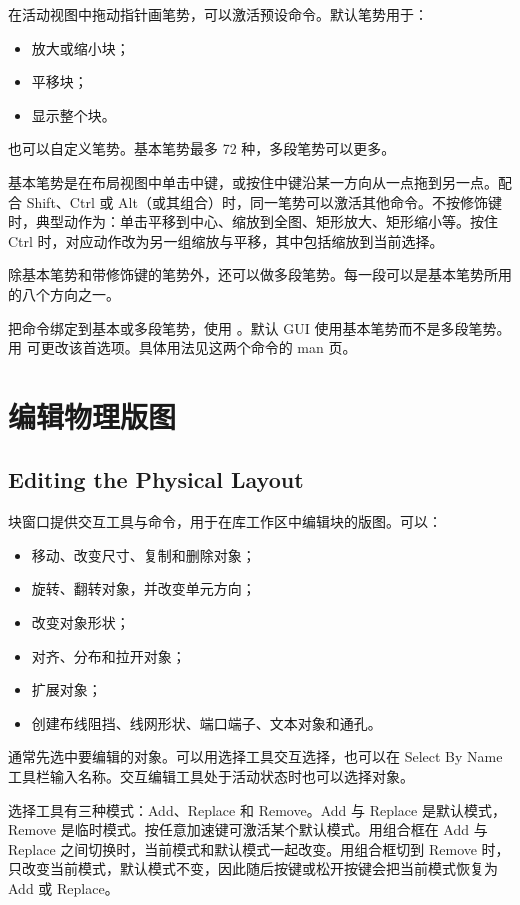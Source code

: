 在活动视图中拖动指针画笔势，可以激活预设命令。默认笔势用于：
\begin{itemize}
  \item 放大或缩小块；
  \item 平移块；
  \item 显示整个块。
\end{itemize}

也可以自定义笔势。基本笔势最多 72 种，多段笔势可以更多。

基本笔势是在布局视图中单击中键，或按住中键沿某一方向从一点拖到另一点。配合 Shift、Ctrl 或 Alt（或其组合）时，同一笔势可以激活其他命令。不按修饰键时，典型动作为：单击平移到中心、缩放到全图、矩形放大、矩形缩小等。按住 Ctrl 时，对应动作改为另一组缩放与平移，其中包括缩放到当前选择。

除基本笔势和带修饰键的笔势外，还可以做多段笔势。每一段可以是基本笔势所用的八个方向之一。

把命令绑定到基本或多段笔势，使用 。默认 GUI 使用基本笔势而不是多段笔势。用  可更改该首选项。具体用法见这两个命令的 man 页。

\section{编辑物理版图}
\subsection*{Editing the Physical Layout}

块窗口提供交互工具与命令，用于在库工作区中编辑块的版图。可以：
\begin{itemize}
  \item 移动、改变尺寸、复制和删除对象；
  \item 旋转、翻转对象，并改变单元方向；
  \item 改变对象形状；
  \item 对齐、分布和拉开对象；
  \item 扩展对象；
  \item 创建布线阻挡、线网形状、端口端子、文本对象和通孔。
\end{itemize}

通常先选中要编辑的对象。可以用选择工具交互选择，也可以在 Select By Name 工具栏输入名称。交互编辑工具处于活动状态时也可以选择对象。

选择工具有三种模式：Add、Replace 和 Remove。Add 与 Replace 是默认模式，Remove 是临时模式。按任意加速键可激活某个默认模式。用组合框在 Add 与 Replace 之间切换时，当前模式和默认模式一起改变。用组合框切到 Remove 时，只改变当前模式，默认模式不变，因此随后按键或松开按键会把当前模式恢复为 Add 或 Replace。

